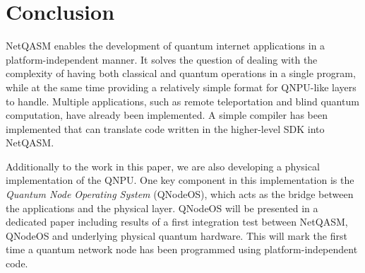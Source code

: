 \section{Conclusion}
\label{sec:conclusion}
\ac{NetQASM} enables the development of quantum internet applications in a platform-independent manner.
It solves the question of dealing with the complexity of having both classical and quantum operations in a single program, while at the same time providing a relatively simple format for \ac{QNPU}-like layers to handle.
Multiple applications, such as remote teleportation and blind quantum computation, have already been implemented.
A simple compiler has been implemented that can translate code written in the higher-level SDK into \ac{NetQASM}.

Additionally to the work in this paper, we are also developing a physical implementation of the \ac{QNPU}.
One key component in this implementation is the \emph{Quantum Node Operating System} (QNodeOS), which acts as the bridge between the applications and the physical layer.
QNodeOS will be presented in a dedicated paper including results of a first integration test between \ac{NetQASM}, QNodeOS and underlying physical quantum hardware.
This will mark the first time a quantum network node has been programmed using platform-independent code.